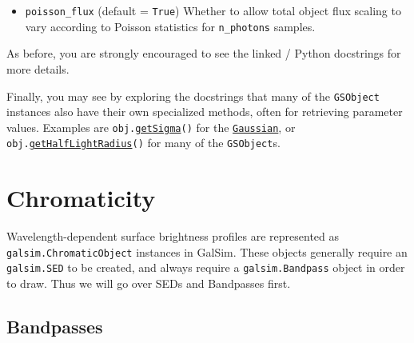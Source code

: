 \documentclass[preprint,11pt]{../../devel/modules/aastex}
\begin{document}
\begin{itemize}
{\begin{itemize}
  provided, the allowed extra noise in each pixel.  This is only
  relevant if \texttt{n\_photons = 0}, so the number of photons is
  being automatically calculated.  In that case, if the image noise is
  dominated by the sky background, you can get away with using fewer
  shot photons than the full \texttt{n\_photons = flux}.  Essentially
  each shot photon can have a $\texttt{flux} > 1$, which increases the
  noise in each pixel.  The \texttt{max\_extra\_noise} parameter
  specifies how much extra noise per pixel is allowed because of this
  approximation.
\item \texttt{poisson\_flux} (default = \texttt{True}) \newline
  Whether to allow total object flux scaling to vary according to
  Poisson statistics for \texttt{n\_photons} samples.
\end{itemize}
As before, you are strongly encouraged to see the linked / Python
docstrings for more details.
}
\end{itemize}

Finally, you may see by exploring the docstrings that many of the \texttt{GSObject}
instances also have their own specialized methods, often for
retrieving parameter values. Examples are
  \texttt{obj.}\href{http://galsim-developers.github.com/GalSim/classgalsim_1_1base_1_1_gaussian.html#a418f2826a7b8934cfedc181de23ce826}{\texttt{getSigma}}\texttt{()}
for the
\href{http://galsim-developers.github.com/GalSim/classgalsim_1_1base_1_1_gaussian.html}{\texttt{Gaussian}},
or
  \texttt{obj.}\href{http://galsim-developers.github.com/GalSim/classgalsim_1_1base_1_1_sersic.html#ad6ca39293c6b478fc052d07ea51d086f}{\texttt{getHalfLightRadius}}\texttt{()}
for many of the \texttt{GSObject}s.

\section{Chromaticity}\label{sect:chromaticity}

Wavelength-dependent surface brightness profiles are represented as
\texttt{galsim.ChromaticObject} instances in GalSim.
These objects generally require an \texttt{galsim.SED} to be created,
and always require a \texttt{galsim.Bandpass} object in order to draw.
Thus we will go over SEDs and Bandpasses first.

\subsection{Bandpasses}
\end{document}
